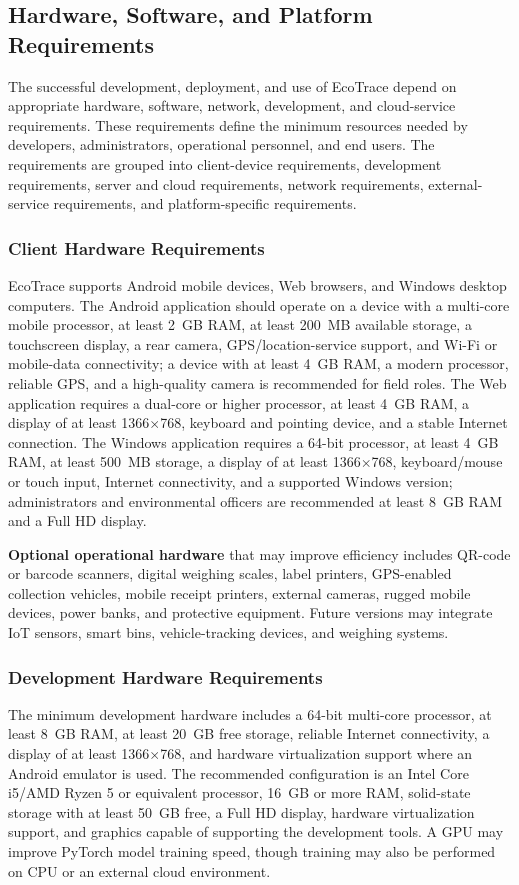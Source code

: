 \subsection{Hardware, Software, and Platform Requirements}

The successful development, deployment, and use of EcoTrace depend on
appropriate hardware, software, network, development, and cloud-service
requirements. These requirements define the minimum resources needed by
developers, administrators, operational personnel, and end users. The
requirements are grouped into client-device requirements, development
requirements, server and cloud requirements, network requirements,
external-service requirements, and platform-specific requirements.

\subsubsection{Client Hardware Requirements}
EcoTrace supports Android mobile devices, Web browsers, and Windows
desktop computers. The Android application should operate on a device with
a multi-core mobile processor, at least 2~GB RAM, at least 200~MB available
storage, a touchscreen display, a rear camera, GPS/location-service support,
and Wi-Fi or mobile-data connectivity; a device with at least 4~GB RAM, a
modern processor, reliable GPS, and a high-quality camera is recommended
for field roles. The Web application requires a dual-core or higher processor,
at least 4~GB RAM, a display of at least 1366$\times$768, keyboard and
pointing device, and a stable Internet connection. The Windows application
requires a 64-bit processor, at least 4~GB RAM, at least 500~MB storage, a
display of at least 1366$\times$768, keyboard/mouse or touch input, Internet
connectivity, and a supported Windows version; administrators and
environmental officers are recommended at least 8~GB RAM and a Full HD
display.

\textbf{Optional operational hardware} that may improve efficiency
includes QR-code or barcode scanners, digital weighing scales, label printers,
GPS-enabled collection vehicles, mobile receipt printers, external cameras,
rugged mobile devices, power banks, and protective equipment. Future
versions may integrate IoT sensors, smart bins, vehicle-tracking devices, and
weighing systems.

\subsubsection{Development Hardware Requirements}
The minimum development hardware includes a 64-bit multi-core
processor, at least 8~GB RAM, at least 20~GB free storage, reliable Internet
connectivity, a display of at least 1366$\times$768, and hardware
virtualization support where an Android emulator is used. The recommended
configuration is an Intel Core i5/AMD Ryzen 5 or equivalent processor,
16~GB or more RAM, solid-state storage with at least 50~GB free, a Full HD
display, hardware virtualization support, and graphics capable of supporting
the development tools. A GPU may improve PyTorch model training speed,
though training may also be performed on CPU or an external cloud
environment.

